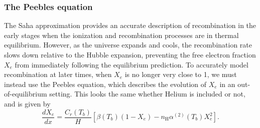 \documentclass{aa}
\numberwithin{equation}{section}
\numberwithin{table}{section}
\numberwithin{figure}{section}
\begin{document}





\subsubsection{The Peebles equation}
The Saha approximation provides an accurate description of recombination in the early stages when the ionization and recombination processes are in thermal equilibrium. However, as the universe expands and cools, the recombination rate slows down relative to the Hubble expansion, preventing the free electron fraction $X_e$ from immediately following the equilibrium prediction. To accurately model recombination at later times, when $X_e$ is no longer very close to 1, we must instead use the Peebles equation, which describes the evolution of $X_e$ in an out-of-equilibrium setting. This looks the same whether Helium is included or not, and is given by
\begin{equation}
\frac{dX_e}{dx} = \frac{C_r(T_b)}{H} \left[ \beta(T_b) (1 - X_e) - n_\text{H}\alpha^{(2)}(T_b) X_e^2 \right]. \label{eq: Peebles}
\end{equation}
\end{document}

